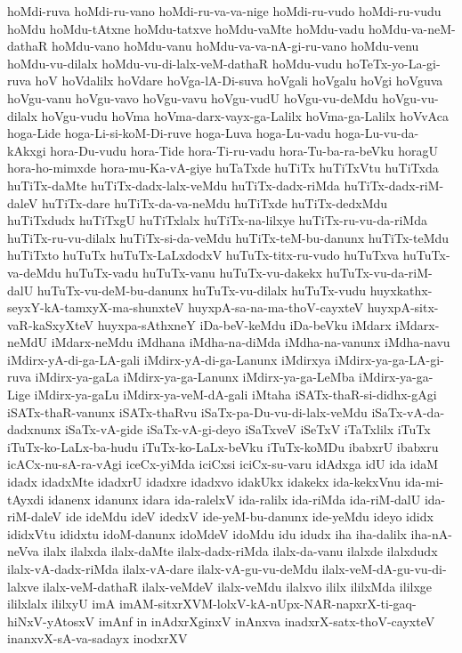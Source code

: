 {hoMdi-ruva
hoMdi-ru-vano
hoMdi-ru-va-va-nige
hoMdi-ru-vudo
hoMdi-ru-vudu
hoMdu
hoMdu-tAtxne
hoMdu-tatxve
hoMdu-vaMte
hoMdu-vadu
hoMdu-va-neM-dathaR
hoMdu-vano
hoMdu-vanu
hoMdu-va-va-nA-gi-ru-vano
hoMdu-venu
hoMdu-vu-dilalx
hoMdu-vu-di-lalx-veM-dathaR
hoMdu-vudu
hoTeTx-yo-La-gi-ruva
hoV
hoVdalilx
hoVdare
hoVga-lA-Di-suva
hoVgali
hoVgalu
hoVgi
hoVguva
hoVgu-vanu
hoVgu-vavo
hoVgu-vavu
hoVgu-vudU
hoVgu-vu-deMdu
hoVgu-vu-dilalx
hoVgu-vudu
hoVma
hoVma-darx-vayx-ga-Lalilx
hoVma-ga-Lalilx
hoVvAca
hoga-Lide
hoga-Li-si-koM-Di-ruve
hoga-Luva
hoga-Lu-vadu
hoga-Lu-vu-da-kAkxgi
hora-Du-vudu
hora-Tide
hora-Ti-ru-vadu
hora-Tu-ba-ra-beVku
horagU
hora-ho-mimxde
hora-mu-Ka-vA-giye
huTaTxde
huTiTx
huTiTxVtu
huTiTxda
huTiTx-daMte
huTiTx-dadx-lalx-veMdu
huTiTx-dadx-riMda
huTiTx-dadx-riM-daleV
huTiTx-dare
huTiTx-da-va-neMdu
huTiTxde
huTiTx-dedxMdu
huTiTxdudx
huTiTxgU
huTiTxlalx
huTiTx-na-lilxye
huTiTx-ru-vu-da-riMda
huTiTx-ru-vu-dilalx
huTiTx-si-da-veMdu
huTiTx-teM-bu-danunx
huTiTx-teMdu
huTiTxto
huTuTx
huTuTx-LaLxdodxV
huTuTx-titx-ru-vudo
huTuTxva
huTuTx-va-deMdu
huTuTx-vadu
huTuTx-vanu
huTuTx-vu-dakekx
huTuTx-vu-da-riM-dalU
huTuTx-vu-deM-bu-danunx
huTuTx-vu-dilalx
huTuTx-vudu
huyxkathx-seyxY-kA-tamxyX-ma-shunxteV
huyxpA-sa-na-ma-thoV-cayxteV
huyxpA-sitx-vaR-kaSxyXteV
huyxpa-sAthxneY
iDa-beV-keMdu
iDa-beVku
iMdarx
iMdarx-neMdU
iMdarx-neMdu
iMdhana
iMdha-na-diMda
iMdha-na-vanunx
iMdha-navu
iMdirx-yA-di-ga-LA-gali
iMdirx-yA-di-ga-Lanunx
iMdirxya
iMdirx-ya-ga-LA-gi-ruva
iMdirx-ya-gaLa
iMdirx-ya-ga-Lanunx
iMdirx-ya-ga-LeMba
iMdirx-ya-ga-Lige
iMdirx-ya-gaLu
iMdirx-ya-veM-dA-gali
iMtaha
iSATx-thaR-si-didhx-gAgi
iSATx-thaR-vanunx
iSATx-thaRvu
iSaTx-pa-Du-vu-di-lalx-veMdu
iSaTx-vA-da-dadxnunx
iSaTx-vA-gide
iSaTx-vA-gi-deyo
iSaTxveV
iSeTxV
iTaTxlilx
iTuTx
iTuTx-ko-LaLx-ba-hudu
iTuTx-ko-LaLx-beVku
iTuTx-koMDu
ibabxrU
ibabxru
icACx-nu-sA-ra-vAgi
iceCx-yiMda
iciCxsi
iciCx-su-varu
idAdxga
idU
ida
idaM
idadx
idadxMte
idadxrU
idadxre
idadxvo
idakUkx
idakekx
ida-kekxVnu
ida-mi-tAyxdi
idanenx
idanunx
idara
ida-ralelxV
ida-ralilx
ida-riMda
ida-riM-dalU
ida-riM-daleV
ide
ideMdu
ideV
idedxV
ide-yeM-bu-danunx
ide-yeMdu
ideyo
ididx
ididxVtu
ididxtu
idoM-danunx
idoMdeV
idoMdu
idu
idudx
iha
iha-dalilx
iha-nA-neVva
ilalx
ilalxda
ilalx-daMte
ilalx-dadx-riMda
ilalx-da-vanu
ilalxde
ilalxdudx
ilalx-vA-dadx-riMda
ilalx-vA-dare
ilalx-vA-gu-vu-deMdu
ilalx-veM-dA-gu-vu-di-lalxve
ilalx-veM-dathaR
ilalx-veMdeV
ilalx-veMdu
ilalxvo
ililx
ililxMda
ililxge
ililxlalx
ililxyU
imA
imAM-sitxrXVM-lolxV-kA-nUpx-NAR-napxrX-ti-gaq-hiNxV-yAtosxV
imAnf
in
inAdxrXginxV
inAnxva
inadxrX-satx-thoV-cayxteV
inanxvX-sA-va-sadayx
inodxrXV
}
